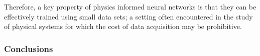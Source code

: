 \documentclass{beamer}
\begin{document}
\begin{frame}

Therefore, a key property of physics informed neural networks is that they can be effectively trained using small data sets; a setting often encountered in the study of physical systems for which the cost of data acquisition may be prohibitive.
    
\end{frame}


\begin{frame}
    \frametitle{Conclusions}

\end{frame}




\end{document}
